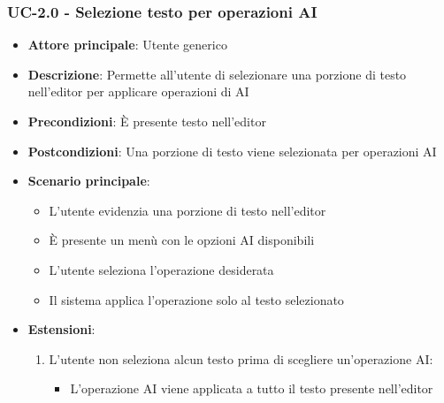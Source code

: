 \documentclass[11pt,a4paper]{article}
\begin{document}
\subsubsection{UC-2.0 - Selezione testo per operazioni AI}
\begin{itemize}
    \item \textbf{Attore principale}: Utente generico
    \item \textbf{Descrizione}: Permette all’utente di selezionare una porzione di testo nell’editor per applicare operazioni di AI
    \item \textbf{Precondizioni}: È presente testo nell'editor
    \item \textbf{Postcondizioni}: Una porzione di testo viene selezionata per operazioni AI
    \item \textbf{Scenario principale}: 
        \begin{itemize}
            \item L'utente evidenzia una porzione di testo nell'editor
            \item È presente un menù con le opzioni AI disponibili
            \item L'utente seleziona l'operazione desiderata
            \item Il sistema applica l'operazione solo al testo selezionato
        \end{itemize}
    \item \textbf{Estensioni}: 
         \begin{enumerate}
            \item L'utente non seleziona alcun testo prima di scegliere un'operazione AI:
                \begin{itemize}
                    \item L'operazione AI viene applicata a tutto il testo presente nell'editor
                \end{itemize}
        \end{enumerate}
\end{itemize}
\end{document}
